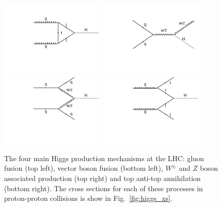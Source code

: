 \begin{figure}
  \includegraphics[width=0.45\textwidth]{theory/plots/ggh.pdf}
  \includegraphics[width=0.45\textwidth]{theory/plots/vh.pdf}\\
  \includegraphics[width=0.45\textwidth]{theory/plots/qqh.pdf}
  \includegraphics[width=0.45\textwidth]{theory/plots/tth.pdf}
  \caption[Feynman diagrams for \acs{SM} Higgs production at the \acs{LHC}]{The four main \SM Higgs production mechanisms at the LHC: gluon fusion (top left), vector boson fusion (bottom left), $W^{\pm}$ and $Z$ boson associated production (top right) and top anti-top annihilation (bottom right). The cross sections for each of these processes in proton-proton collisions is show in Fig.~\ref{fig:higgs_xs}.}
  \label{fig:feyn_prod}
\end{figure}

